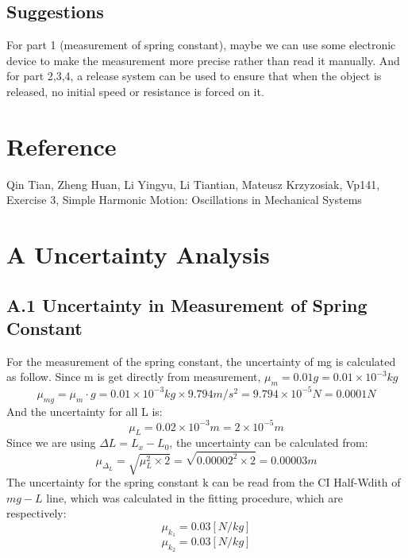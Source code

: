 \documentclass[11pt,a4paper]{article}
\begin{document}
\subsection{Suggestions}
\qquad For part 1 (measurement of spring constant), maybe we can use some electronic device to make the measurement more precise rather than read it manually. And for part 2,3,4, a release system can be used to ensure that when the object is released, no initial speed or resistance is forced on it.

\section{Reference}
Qin Tian, Zheng Huan, Li Yingyu, Li Tiantian, Mateusz Krzyzosiak, Vp141, Exercise 3, Simple Harmonic Motion:
Oscillations in Mechanical Systems


\section*{A Uncertainty Analysis}
\subsection*{A.1 Uncertainty in Measurement of Spring Constant}
For the measurement of the spring constant, the uncertainty of mg is calculated as follow. Since m is get directly from measurement, $\mu_m=0.01g=0.01\times 10^{-3}kg$
\begin{equation*}
    \mu_{mg}=\mu_m\cdot g=0.01\times 10^{-3}kg\times 9.794 m/s^2=9.794\times 10^{-5}N=0.0001N
\end{equation*}
And the uncertainty for all L is: 
\begin{equation*}
    \mu_L=0.02\times 10^{-3}m=2\times 10^{-5}m
\end{equation*}
Since we are using $\Delta L=L_x-L_0$, the uncertainty can be calculated from:
\begin{equation*}
    \mu_{\Delta_L}=\sqrt{\mu_L^2\times 2}=\sqrt{0.00002^2\times 2}=0.00003m
\end{equation*}
The uncertainty for the spring constant k can be read from the CI Half-Wdith of $mg-L$ line, which was calculated in the fitting procedure, which are respectively:
\\
\begin{equation*}
    \mu_{k_1}=0.03[N/kg]
\end{equation*}
\begin{equation*}
    \mu_{k_2}= 0.03[N/kg]
\end{equation*}
\end{document}
